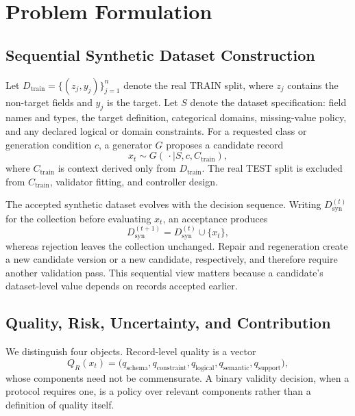 \section{Problem Formulation}
\label{sec:formulation}

\subsection{Sequential Synthetic Dataset Construction}

Let $D_{\mathrm{train}}=\{(z_j,y_j)\}_{j=1}^{n}$ denote the real TRAIN split,
where $z_j$ contains the non-target fields and $y_j$ is the target. Let $S$
denote the dataset specification: field names and types, the target definition,
categorical domains, missing-value policy, and any declared logical or domain
constraints. For a requested class or generation condition $c$, a generator
$G$ proposes a candidate record
\begin{equation}
  x_t \sim G\!\left(\,\cdot \mid S,c,C_{\mathrm{train}}\right),
  \label{eq:generation}
\end{equation}
where $C_{\mathrm{train}}$ is context derived only from $D_{\mathrm{train}}$.
The real TEST split is excluded from $C_{\mathrm{train}}$, validator fitting,
and controller design.

The accepted synthetic dataset evolves with the decision sequence. Writing
$D_{\mathrm{syn}}^{(t)}$ for the collection before evaluating $x_t$, an
acceptance produces
\begin{equation}
  D_{\mathrm{syn}}^{(t+1)}
  =D_{\mathrm{syn}}^{(t)}\cup\{x_t\},
  \label{eq:accepted-update}
\end{equation}
whereas rejection leaves the collection unchanged. Repair and regeneration
create a new candidate version or a new candidate, respectively, and therefore
require another validation pass. This sequential view matters because a
candidate's dataset-level value depends on records accepted earlier.

\subsection{Quality, Risk, Uncertainty, and Contribution}

We distinguish four objects. Record-level quality is a vector
\begin{equation}
  Q_R(x_t)=
  \bigl(q_{\mathrm{schema}},q_{\mathrm{constraint}},
        q_{\mathrm{logical}},q_{\mathrm{semantic}},q_{\mathrm{support}}\bigr),
  \label{eq:record-quality}
\end{equation}
whose components need not be commensurate. A binary validity decision, when a
protocol requires one, is a policy over relevant components rather than a
definition of quality itself.

